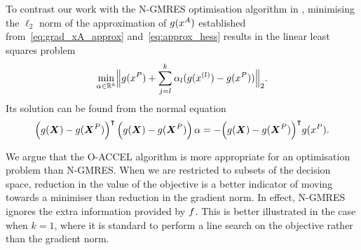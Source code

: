 \documentclass[main.tex]{subfiles}
\begin{document}
To contrast our work with the N-GMRES optimisation algorithm in
\citet{sterck2013steepest}, minimising the $\ell_2$ norm of the
approximation of $g(x^A)$ established
from~\eqref{eq:grad_xA_approx} and~\eqref{eq:approx_hess} results in
the linear least squares problem
\begin{equation}
  \min_{\alpha\in\mathbb
    {R}^k}\Bigl\|g(x^P)+\sum_{j=l}^k\alpha_l(g(x^{(l)})-g(x^P))\Bigr\|_2.
\end{equation}
Its solution can be found from the normal equation
\begin{equation}\label{eq:ngmres_lin_sys}
  {\left(g(\boldsymbol{X})-g(\boldsymbol{X}^P)\right)}^\intercal\left(
    g(\boldsymbol{X})-g(\boldsymbol{X}^P)
  \right)
  \alpha
  = -{\left(g(\boldsymbol{X})-g(\boldsymbol{X}^P)\right)}^\intercal{g(x^P)}.
\end{equation}

We argue that the O-ACCEL algorithm is more appropriate for an
optimisation problem than N-GMRES. %
When we are restricted to subsets of the decision space, reduction in
the value of the objective is a better indicator of moving towards a
minimiser than reduction in the gradient norm. In effect, N-GMRES
ignores the extra information provided by $f$.  This is better
illustrated in the case when $k=1$, where it is standard to perform a
line search on the objective rather than the gradient norm.
\end{document}
